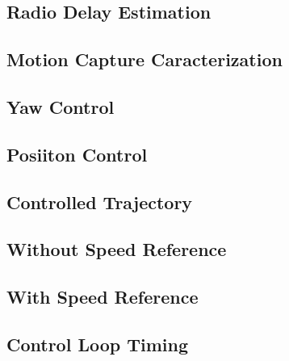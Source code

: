 \documentclass[a4paper, 12pt]{report}
\begin{document}
\subsection{Radio Delay Estimation}
\subsection{Motion Capture Caracterization}
\subsection{Yaw Control}
\subsection{Posiiton Control}
\subsection{Controlled Trajectory}
\subsection{Without Speed Reference}
\subsection{With Speed Reference}
\subsection{Control Loop Timing}
\end{document}
